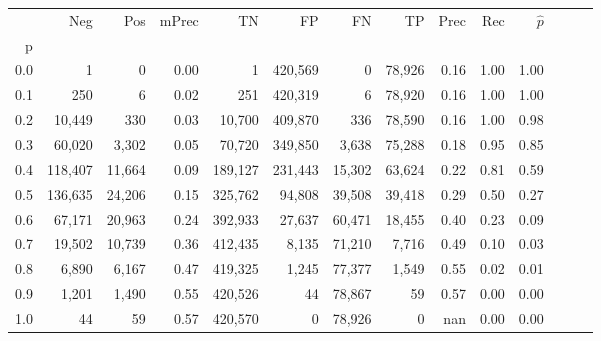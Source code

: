 \begin{tabular}{rrrrrrrrrrrrrr}
\toprule
{} &      Neg &     Pos & mPrec &       TN &       FP &      FN &      TP &  Prec &   Rec & $\hat{p}$ \\
p   &          &         &       &          &          &         &         &       &       &           \\
\midrule
0.0 &        1 &       0 &  0.00 &        1 &  420,569 &       0 &  78,926 &  0.16 &  1.00 &      1.00 \\
0.1 &      250 &       6 &  0.02 &      251 &  420,319 &       6 &  78,920 &  0.16 &  1.00 &      1.00 \\
0.2 &   10,449 &     330 &  0.03 &   10,700 &  409,870 &     336 &  78,590 &  0.16 &  1.00 &      0.98 \\
0.3 &   60,020 &   3,302 &  0.05 &   70,720 &  349,850 &   3,638 &  75,288 &  0.18 &  0.95 &      0.85 \\
0.4 &  118,407 &  11,664 &  0.09 &  189,127 &  231,443 &  15,302 &  63,624 &  0.22 &  0.81 &      0.59 \\
0.5 &  136,635 &  24,206 &  0.15 &  325,762 &   94,808 &  39,508 &  39,418 &  0.29 &  0.50 &      0.27 \\
0.6 &   67,171 &  20,963 &  0.24 &  392,933 &   27,637 &  60,471 &  18,455 &  0.40 &  0.23 &      0.09 \\
0.7 &   19,502 &  10,739 &  0.36 &  412,435 &    8,135 &  71,210 &   7,716 &  0.49 &  0.10 &      0.03 \\
0.8 &    6,890 &   6,167 &  0.47 &  419,325 &    1,245 &  77,377 &   1,549 &  0.55 &  0.02 &      0.01 \\
0.9 &    1,201 &   1,490 &  0.55 &  420,526 &       44 &  78,867 &      59 &  0.57 &  0.00 &      0.00 \\
1.0 &       44 &      59 &  0.57 &  420,570 &        0 &  78,926 &       0 &   nan &  0.00 &      0.00 \\
\bottomrule
\end{tabular}
